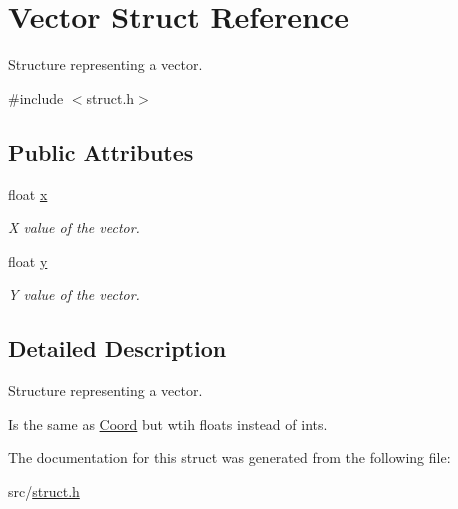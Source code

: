 \hypertarget{struct_vector}{}\section{Vector Struct Reference}
\label{struct_vector}


Structure representing a vector.  




{\ttfamily \#include $<$struct.\+h$>$}

\subsection*{Public Attributes}
\begin{DoxyCompactItemize}
\item 
\mbox{\label{struct_vector_aca49165049a1e21ae47afcfc078819ed}} 
float \hyperlink{struct_vector_aca49165049a1e21ae47afcfc078819ed}{x}
\begin{DoxyCompactList}\small\item\em X value of the vector. \end{DoxyCompactList}\item 
\mbox{\label{struct_vector_a81be9102fca6d9beea3efef522c4c09d}} 
float \hyperlink{struct_vector_a81be9102fca6d9beea3efef522c4c09d}{y}
\begin{DoxyCompactList}\small\item\em Y value of the vector. \end{DoxyCompactList}\end{DoxyCompactItemize}


\subsection{Detailed Description}
Structure representing a vector. 

Is the same as \hyperlink{struct_coord}{Coord} but wtih floats instead of ints. 

The documentation for this struct was generated from the following file\+:\begin{DoxyCompactItemize}
\item 
src/\hyperlink{struct_8h}{struct.\+h}\end{DoxyCompactItemize}
